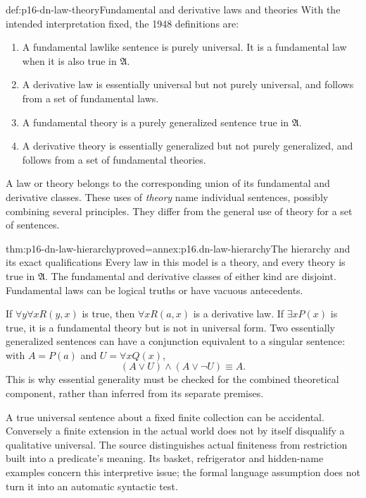 \begin{hbdefinition}{def:p16-dn-law-theory}{Fundamental and derivative laws and theories}
With the intended interpretation fixed, the 1948
definitions are:
\begin{enumerate}
\item A fundamental lawlike sentence is purely universal.
      It is a fundamental law when it is also true in
      \(\mathfrak A\).
\item A derivative law is essentially universal but
      not purely universal, and follows from a set
      of fundamental laws.
\item A fundamental theory is a purely generalized
      sentence true in \(\mathfrak A\).
\item A derivative theory is essentially generalized
      but not purely generalized, and follows from
      a set of fundamental theories.
\end{enumerate}
A law or theory belongs to the corresponding union
of its fundamental and derivative classes.
These uses of \emph{theory} name individual sentences,
possibly combining several principles. They differ
from the general use of theory for a set of sentences.
\end{hbdefinition}

\begin{hbtheorem}{thm:p16-dn-law-hierarchy}{proved=annex:p16.dn-law-hierarchy}{The hierarchy and its exact qualifications}
Every law in this model is a theory, and every theory
is true in \(\mathfrak A\). The fundamental and
derivative classes of either kind are disjoint.
Fundamental laws can be logical truths or have
vacuous antecedents.

If \(\forall y\forall xR(y,x)\) is true, then
\(\forall xR(a,x)\) is a derivative law.
If \(\exists xP(x)\) is true, it is a fundamental
theory but is not in universal form.
Two essentially generalized sentences can have
a conjunction equivalent to a singular sentence:
with \(A=P(a)\) and
\(U=\forall xQ(x)\),
\[
                   (A\lor U)\land(A\lor\neg U)\equiv A .
\]
This is why essential generality must be checked
for the combined theoretical component, rather
than inferred from its separate premises.
\end{hbtheorem}

A true universal sentence about a fixed finite
collection can be accidental. Conversely a finite
extension in the actual world does not by itself
disqualify a qualitative universal. The source
distinguishes actual finiteness from restriction
built into a predicate's meaning. Its basket,
refrigerator and hidden-name examples concern this
interpretive issue; the formal language assumption
does not turn it into an automatic syntactic test.

